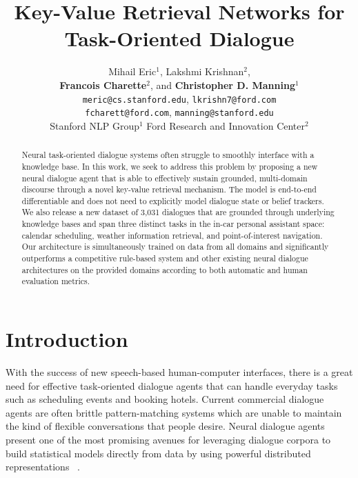 \documentclass[11pt,a4paper]{article}
\title{Key-Value Retrieval Networks for Task-Oriented Dialogue}
\author{ Mihail Eric$^{1}$, Lakshmi Krishnan$^{2}$, \\\textbf{Francois Charette}$^{2}$, and \textbf{Christopher D. Manning}$^{1}$\\
{\tt meric@cs.stanford.edu}, {\tt lkrishn7@ford.com} \\
{\tt fcharett@ford.com}, {\tt manning@stanford.edu} \\
Stanford NLP Group$^{1}$ \hspace{0.02in}
Ford Research and Innovation Center$^{2}$}
\date{}
\begin{document}
\maketitle

\begin{abstract}
  Neural task-oriented dialogue systems often struggle to smoothly interface with a knowledge base. In this work, we seek to address this problem by proposing a new neural dialogue agent that is able to effectively sustain grounded, multi-domain discourse through a novel key-value retrieval mechanism. The model is end-to-end differentiable and does not need to explicitly model dialogue state or belief trackers. We also release a new dataset of 3,031 dialogues that are grounded through underlying knowledge bases and span three distinct tasks in the in-car personal assistant space: calendar scheduling, weather information retrieval, and point-of-interest navigation. Our architecture is simultaneously trained on data from all domains and significantly outperforms a competitive rule-based system and other existing neural dialogue architectures on the provided domains according to both automatic and human evaluation metrics.
  
\end{abstract}


\section{Introduction}
  With the success of new speech-based human-computer interfaces, there is a great need for effective task-oriented dialogue agents that can handle everyday tasks such as scheduling events and booking hotels. Current commercial dialogue agents are often brittle pattern-matching systems which are unable to maintain the kind of flexible conversations that people desire. Neural dialogue agents present one of the most promising avenues for leveraging dialogue corpora to build statistical models directly from data by using powerful distributed representations ~\cite{Bordes:16, Wen:16, Dhingra:16}. 
\end{document}
